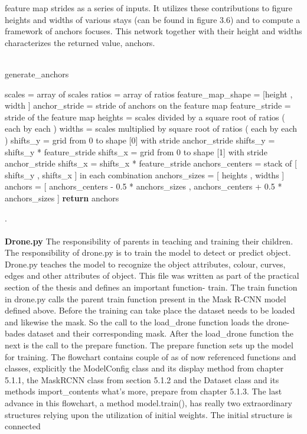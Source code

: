 feature map strides as a series of inputs. It utilizes these contributions to figure heights and widths of various stays (can be found in figure 3.6) and to compute a framework of anchors
focuses. This network together with their height and widths characterizes the returned value, anchors.
\\
\\
\begin{algorithm}[H]
  \caption{generate\_anchors}
  \SetAlgoLined
  \DontPrintSemicolon
  scales = array of scales\;
ratios = array of ratios\;
feature\_map\_shape = [height , width ]\;
anchor\_stride = stride of anchors on the feature map\;
feature\_stride = stride of the feature map\;
 heights = scales divided by a square root of ratios ( each by each )\;
 widths = scales multiplied by square root of ratios ( each by each )\;
 shifts\_y = grid from 0 to shape [0] with stride anchor\_stride\;
 shifts\_y = shifts\_y * feature\_stride\;
 shifts\_x = grid from 0 to shape [1] with stride anchor\_stride\;
 shifts\_x = shifts\_x * feature\_stride\;
 anchors\_centers = stack of [ shifts\_y , shifts\_x ] in each combination\;
anchors\_sizes = [ heights , widths ]\;
anchors = [ anchors\_centers - 0.5 * anchors\_sizes , anchors\_centers + 0.5 * anchors\_sizes ]\;
\textbf{return} anchors
\end{algorithm}
.\\
\\
\textbf{Drone.py}
The responsibility of parents in teaching and training their children. The responsibility of drone.py is to train the model to detect or 
predict object. Drone.py teaches the model to recognize the object attributes, colour, curves, edges and other attributes of object. 
This file was written as part of the practical section of the thesis and defines an important function- train. 
The train function in drone.py calls the parent train function present in the Mask R-CNN model defined above.  Before the training can take place the dataset needs to be loaded and likewise the mask. So the call to the load\_drone function loads the drone-bades dataset and their corresponding mask.   
After the load\_drone function the next is the call to the prepare function. The prepare function sets up the model for training.
The flowchart contains couple of as of now referenced functions and classes, explicitly the ModelConfig class and its display method from chapter 5.1.1, the MaskRCNN 
class from section 5.1.2 and the Dataset class and its methods import\_contents what's more, prepare from chapter 5.1.3. 
The last advance in this flowchart, a method model.train(), has really two extraordinary structures relying upon the utilization of initial weights. The initial structure is connected 
